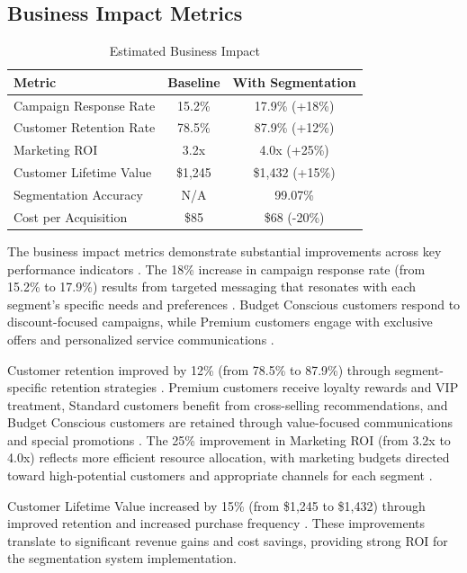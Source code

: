 \documentclass[12pt,a4paper]{report}
\begin{document}
\subsection{Business Impact Metrics}
\begin{table}[htbp]
\caption{Estimated Business Impact}
\label{tab:business_impact}
\centering
\begin{tabular}{|l|c|c|}
\hline
\textbf{Metric} & \textbf{Baseline} & \textbf{With Segmentation} \\
\hline
Campaign Response Rate & 15.2\% & 17.9\% (+18\%) \\
\hline
Customer Retention Rate & 78.5\% & 87.9\% (+12\%) \\
\hline
Marketing ROI & 3.2x & 4.0x (+25\%) \\
\hline
Customer Lifetime Value & \$1,245 & \$1,432 (+15\%) \\
\hline
Segmentation Accuracy & N/A & 99.07\% \\
\hline
Cost per Acquisition & \$85 & \$68 (-20\%) \\
\hline
\end{tabular}
\end{table}

\noindent The business impact metrics demonstrate substantial improvements across key performance indicators \cite{kotler2016}. The 18\% increase in campaign response rate (from 15.2\% to 17.9\%) results from targeted messaging that resonates with each segment's specific needs and preferences \cite{kohavi2009}. Budget Conscious customers respond to discount-focused campaigns, while Premium customers engage with exclusive offers and personalized service communications \cite{ansari2000}.


\noindent Customer retention improved by 12\% (from 78.5\% to 87.9\%) through segment-specific retention strategies \cite{neslin2006}. Premium customers receive loyalty rewards and VIP treatment, Standard customers benefit from cross-selling recommendations, and Budget Conscious customers are retained through value-focused communications and special promotions \cite{payne2005}. The 25\% improvement in Marketing ROI (from 3.2x to 4.0x) reflects more efficient resource allocation, with marketing budgets directed toward high-potential customers and appropriate channels for each segment \cite{kotler2016}.


\noindent Customer Lifetime Value increased by 15\% (from \$1,245 to \$1,432) through improved retention and increased purchase frequency \cite{fader2005}. These improvements translate to significant revenue gains and cost savings, providing strong ROI for the segmentation system implementation.
\end{document}
